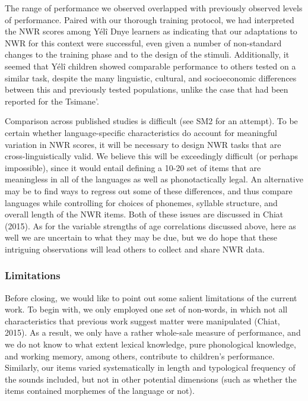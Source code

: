 \documentclass[
  english,
  ,man,floatsintext]{apa6}
\begin{document}
The range of performance we observed overlapped with previously observed levels of performance. Paired with our thorough training protocol, we had interpreted the NWR scores among Yélî Dnye learners as indicating that our adaptations to NWR for this context were successful, even given a number of non-standard changes to the training phase and to the design of the stimuli. Additionally, it seemed that Yélî children showed comparable performance to others tested on a similar task, despite the many linguistic, cultural, and socioeconomic differences between this and previously tested populations, unlike the case that had been reported for the Tsimane'.

Comparison across published studies is difficult (see SM2 for an attempt). To be certain whether language-specific characteristics do account for meaningful variation in NWR scores, it will be necessary to design NWR tasks that are cross-linguistically valid. We believe this will be exceedingly difficult (or perhaps impossible), since it would entail defining a 10-20 set of items that are meaningless in all of the languages as well as phonotactically legal. An alternative may be to find ways to regress out some of these differences, and thus compare languages while controlling for choices of phonemes, syllable structure, and overall length of the NWR items. Both of these issues are discussed in Chiat (2015). As for the variable strengths of age correlations discussed above, here as well we are uncertain to what they may be due, but we do hope that these intriguing observations will lead others to collect and share NWR data.

\hypertarget{limitations}{%
\subsubsection{Limitations}\label{limitations}}

Before closing, we would like to point out some salient limitations of the current work. To begin with, we only employed one set of non-words, in which not all characteristics that previous work suggest matter were manipulated (Chiat, 2015). As a result, we only have a rather whole-sale measure of performance, and we do not know to what extent lexical knowledge, pure phonological knowledge, and working memory, among others, contribute to children's performance. Similarly, our items varied systematically in length and typological frequency of the sounds included, but not in other potential dimensions (such as whether the items contained morphemes of the language or not).
\end{document}
